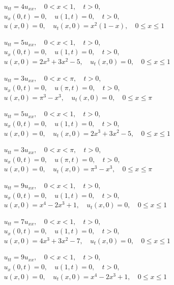 \begin{exerciselist}
\item\label{exer:12.2.21}$u_{tt}=4u_{xx},\quad 0<x<1,\quad t>0$,\\
$u_x(0,t)=0,\quad u(1,t)=0,\quad t>0$,\\
$u(x,0)=0,\quad u_t(x,0)=x^2(1-x),\quad0\le x\le 1$

\item\label{exer:12.2.22}\Cex
$u_{tt}=5u_{xx},\quad 0<x<1,\quad t>0$,\\
$u_x(0,t)=0,\quad u(1,t)=0,\quad t>0$,\\
$u(x,0)=2x^3+3x^2-5,\quad u_t(x,0)=0,\quad0\le x\le1$




\item\label{exer:12.2.23}$u_{tt}=3u_{xx},\quad 0<x<\pi,\quad t>0$,\\
$u_x(0,t)=0,\quad u(\pi,t)=0,\quad t>0$,\\
$u(x,0)=\pi^3-x^3,\quad u_t(x,0)=0,\quad0\le x\le\pi$

\item\label{exer:12.2.24}$u_{tt}=5u_{xx},\quad 0<x<1,\quad t>0$,\\
$u_x(0,t)=0,\quad u(1,t)=0,\quad t>0$,\\
$u(x,0)=0,\quad u_t(x,0)=2x^3+3x^2-5,\quad0\le x\le1$


\item\label{exer:12.2.25}\Cex
$u_{tt}=3u_{xx},\quad 0<x<\pi,\quad t>0$,\\
$u_x(0,t)=0,\quad u(\pi,t)=0,\quad t>0$,\\
$u(x,0)=0,\quad u_t(x,0)=\pi^3-x^3,\quad0\le x\le\pi$


\item\label{exer:12.2.26}$u_{tt}=9u_{xx},\quad 0<x<1,\quad t>0$,\\
$u_x(0,t)=0,\quad u(1,t)=0,\quad t>0$,\\
$u(x,0)=x^4-2x^3+1,\quad u_t(x,0)=0,\quad0\le x\le1$





\item\label{exer:12.2.27}$u_{tt}=7u_{xx},\quad 0<x<1,\quad t>0$,\\
$u_x(0,t)=0,\quad u(1,t)=0,\quad t>0$,\\
$u(x,0)=4x^3+3x^2-7,\quad u_t(x,0)=0,\quad0\le x\le1$


\item\label{exer:12.2.28}$u_{tt}=9u_{xx},\quad 0<x<1,\quad t>0$,\\
$u_x(0,t)=0,\quad u(1,t)=0,\quad t>0$,\\
$u(x,0)=0,\quad u_t(x,0)=x^4-2x^3+1,\quad0\le x\le1$


\end{exerciselist}

